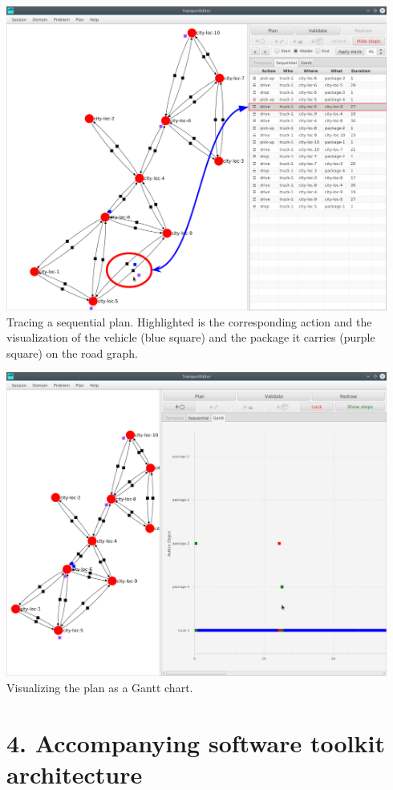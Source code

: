 \begin{center}
\includegraphics[width=0.94\textwidth]{../img/transporteditor_planstates}
Tracing a sequential plan. Highlighted is the corresponding \drive{} action and the visualization of the vehicle (blue square) and the package it carries (purple square) on the road graph.
\end{center}
\medskip

\begin{center}
\includegraphics[width=0.94\textwidth]{../img/transporteditor_gantt}
Visualizing the plan as a Gantt chart.
\end{center}

\newpage

\section*{4. Accompanying software toolkit architecture}\label{transport-project}

